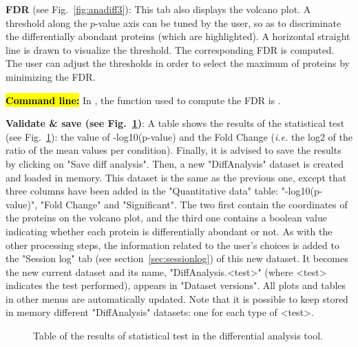 \documentclass[12pt]{article}
\begin{document}
{\textbf{FDR} (see Fig.~\ref{fig:anadiff3}): This tab also displays the 
volcano plot. A threshold along the $p$-value axis can be tuned by the user, 
so as to discriminate the differentially abondant proteins (which are 
highlighted). A horizontal straight line is drawn to visualize the threshold. 
The corresponding FDR is computed. The user can adjust the thresholds in 
order to select the maximum of proteins by minimizing the FDR.


\hl{\bf Command line:} In , the function used to compute the 
FDR is .


\textbf{Validate \& save (see Fig.~\ref{fig:anadiff4})}: 
A table shows the results of the statistical test (see 
Fig.~\ref{fig:anadiff4}): the value of -log10(p-value) and the Fold Change 
(\emph{i.e.} the log2 of the ratio of the mean values per condition). Finally, 
it is advised to save the results by clicking on "Save diff analysis". Then, 
a new "DiffAnalysis" dataset is created and loaded in memory. This dataset 
is the same as the previous one, except that three columns have been added in 
the "Quantitative data" table: "-log10(p-value)",  "Fold Change" and 
"Significant". The two first contain the coordinates of the proteins on the 
volcano plot, and the third one contains a boolean value indicating whether 
each protein is differentially abondant or not. As with the other processing 
steps, the information related to the user's choices is added to the 
"Session log" tab (see section~\ref{sec:sessionlog}) of this new dataset.
It becomes the new current dataset and its name, "DiffAnalysis.<test>" (where 
<test> indicates the test performed), appears in "Dataset versions". All 
plots and tables in other menus are automatically updated. Note that it is 
possible to keep stored in memory different "DiffAnalysis" datasets: one for 
each type of <test>.


\begin{figure}
\centering
{}
\caption{Table of the results of statistical test in the differential 
analysis tool.}\label{fig:anadiff4}
\end{figure}

}
\end{document}
